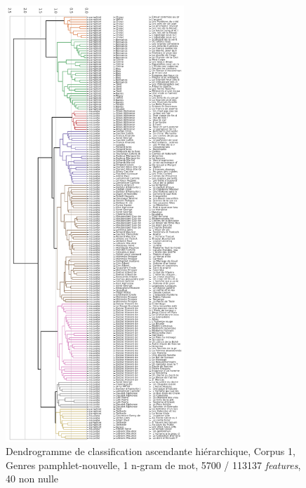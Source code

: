\begin{figure}[H]
\centering %
\includegraphics[width=0.60\textwidth]{img/dendogram-corpus-mix-PamNouvelle.png}
\caption{Dendrogramme de classification ascendante hiérarchique, Corpus 1, Genres pamphlet-nouvelle, 1 n-gram de mot, 5700 / 113137 \textit{features}, 40 non nulle}
\label{'fig:dendogram-corpus-mix-PamNouvelle'}
\end{figure}


